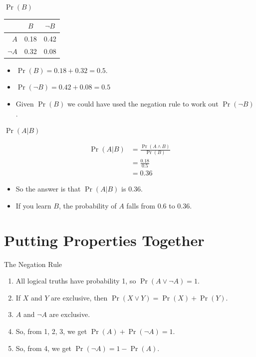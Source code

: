 \documentclass[
  ignorenonframetext,
]{beamer}
\providecommand{\tightlist}{%
  \setlength{\itemsep}{0pt}\setlength{\parskip}{0pt}}
\renewcommand{\,}{\text{, }}
\begin{document}
\begin{frame}{\(\Pr(B)\)}
\protect\hypertarget{prb}{}

\begin{longtable}[]{@{}rcc@{}}
\toprule
& \(B\) & \(\neg B\)\tabularnewline
\midrule
\endhead
\(A\) & 0.18 & 0.42\tabularnewline
\(\neg A\) & 0.32 & 0.08\tabularnewline
\bottomrule
\end{longtable}

\begin{itemize}
\tightlist
\item
  \(\Pr(B) = 0.18 + 0.32 = 0.5\). \pause
\item
  \(\Pr(\neg B) = 0.42 + 0.08 = 0.5\) \pause
\item
  Given \(\Pr(B)\) we could have used the negation rule to work out
  \(\Pr(\neg B)\).
\end{itemize}

\end{frame}

\begin{frame}{\(\Pr(A | B)\)}
\protect\hypertarget{pra-b}{}

\begin{align*}
\Pr(A | B) &= \frac{\Pr(A \wedge B)}{\Pr(B)} \\
 &= \frac{0.18}{0.5} \\
 &= 0.36
\end{align*}

\begin{itemize}
\tightlist
\item
  So the answer is that \(\Pr(A | B)\) is 0.36.
\item
  If you learn \(B\), the probability of \(A\) falls from 0.6 to 0.36.
\end{itemize}

\end{frame}

\hypertarget{putting-properties-together}{%
\section{Putting Properties
Together}\label{putting-properties-together}}

\begin{frame}{The Negation Rule}
\protect\hypertarget{the-negation-rule}{}

\begin{enumerate}
\tightlist
\item
  All logical truths have probability 1, so \(\Pr(A \vee \neg A) = 1\).
  \pause
\item
  If \(X\) and \(Y\) are exclusive, then
  \(\Pr(X \vee Y) = \Pr(X) + \Pr(Y)\). \pause
\item
  \(A\) and \(\neg A\) are exclusive. \pause
\item
  So, from 1, 2, 3, we get \(\Pr(A) + \Pr(\neg A) = 1\). \pause
\item
  So, from 4, we get \(\Pr(\neg A) = 1 - \Pr(A)\).
\end{enumerate}

\end{frame}
\end{document}
